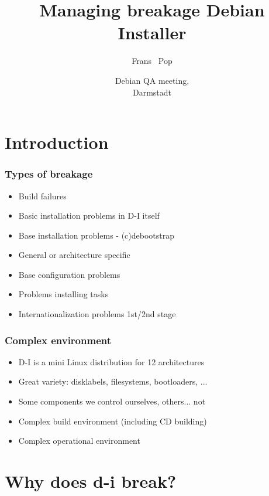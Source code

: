 \documentclass{beamer}
\title[Managing breakage in Debian Installer] %
{Managing breakage Debian Installer}
\author %
{Frans ~Pop}
\date[QA 2005] %
{Debian QA meeting,\\ Darmstadt}
\begin{document}
\begin{frame}
  \titlepage
\end{frame}

\begin{frame}
  \tableofcontents
\end{frame}


\section{Introduction}

\begin{frame}
  \frametitle{Types of breakage}
	\begin{itemize}[<+->]
	\item
		Build failures
	\item
		Basic installation problems in D-I itself
	\item
		Base installation problems - (c)debootstrap
	\item
		General or architecture specific
	\item
		Base configuration problems
	\item
		Problems installing tasks
	\item
		Internationalization problems 1st/2nd stage
	\end{itemize}
\end{frame}

\begin{frame}
  \frametitle{Complex environment}
	\begin{itemize}[<+->]
	\item
		D-I is a mini Linux distribution for 12 architectures
	\item
		Great variety: disklabels, filesystems, bootloaders, ...
	\item
		Some components we control ourselves, others... not
	\item
		Complex build environment (including CD building)
	\item
		Complex operational environment
	\end{itemize}
\end{frame}

\section{Why does d-i break?}
\end{document}
